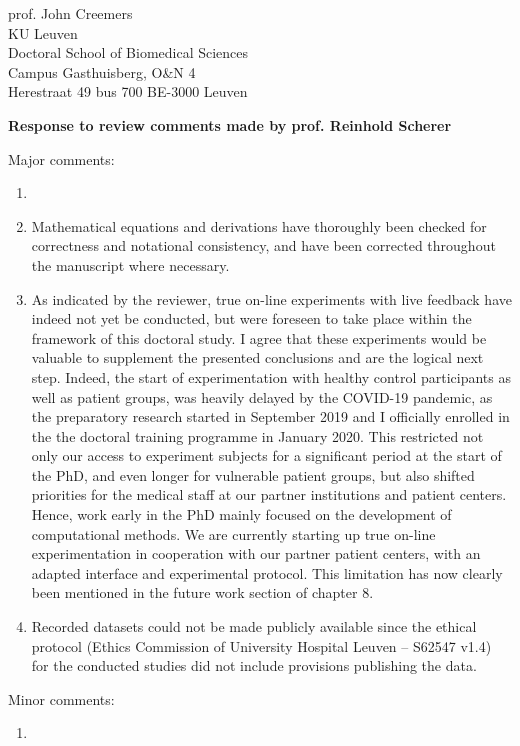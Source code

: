 \documentclass{letter}
\newcommand{\reply}[1]{%
	\textbf{Response to review comments made by prof. #1}

}
\begin{document}
\begin{letter}{
	prof. John Creemers \\
	KU Leuven \\
	Doctoral School of Biomedical Sciences \\
	Campus Gasthuisberg, O\&N 4 \\
	Herestraat 49 bus 700
	BE-3000 Leuven

}
\reply{Reinhold Scherer}
Major comments:
\begin{enumerate}
	\item {}
	\item  Mathematical equations and derivations have thoroughly
	been checked for correctness and notational consistency, and have been
	corrected throughout the manuscript where necessary.
	\item As indicated by the reviewer, true on-line experiments with live
	feedback have indeed not yet be conducted, but were foreseen to take
	place within the framework of this doctoral study.
	I agree that these experiments would be valuable to supplement the
	presented conclusions and are the logical next step.
	Indeed, the start of experimentation with healthy control participants
	as well as patient groups, was heavily delayed by the COVID-19 pandemic, as the
	preparatory research started in September 2019 and I officially
	enrolled in the the doctoral training programme in January 2020.
	This restricted not only our access to experiment subjects for a
	significant period at the start of the PhD, and even longer for
	vulnerable patient groups, but also shifted priorities for the medical
	staff at our partner institutions and patient centers.
	Hence, work early in the PhD mainly focused on the development of
	computational methods.
	We are currently starting up true on-line experimentation in cooperation
	with our partner patient centers, with an adapted interface and experimental protocol.
  This limitation has now clearly been mentioned in the future work section of
  chapter 8.
	\item Recorded datasets could not be made publicly available since the
	ethical protocol (Ethics Commission of University Hospital Leuven --
	S62547 v1.4) for the conducted studies did not include provisions
	publishing the data.
\end{enumerate}
Minor comments:
\begin{enumerate}
	\item
\end{enumerate}


\end{letter}
\end{document}
